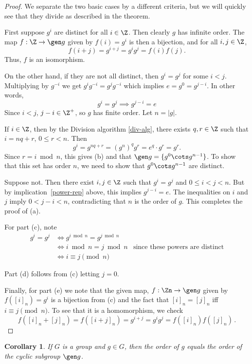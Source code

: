 \documentclass[12pt]{amsart}
\theoremstyle{plain}
\newtheorem{cor}[thm]{Corollary}
\theoremstyle{definition}
\theoremstyle{remark}
\begin{document}
\begin{proof}
  We separate the two basic cases by a different criteria, but we will
  quickly see that they divide as described in the theorem.

  First suppose $g^i$ are distinct for all $i\in\Z$.  Then clearly $g$
  has infinite order.  The map $f:\Z\to \gen g$ given by $f(i)=g^i$ is
  then a bijection, and for all $i,j\in\Z$, 
  $$f(i+j)=g^{i+j} =g^ig^j=f(i)f(j).$$
  Thus, $f$ is an isomorphism.

  On the other hand, if they are not all distinct, then $g^i=g^j$ for
  some $i<j$.  Multiplying by $g^{-i}$ we get $g^ig^{-i} = g^jg^{-i}$
  which implies $e=g^0=g^{j-i}$.  In other words,
\begin{equation} \label{power-rep}
g^i=g^j \implies g^{j-i} = e
\end{equation}
Since $i<j$, $j-i\in\Z^+$, so $g$ has finite order.  Let $n=|g|$.

If $i\in\Z$, then by the Division algorithm \ref{div-alg}, there
exists $q,r\in\Z$ such that $i=nq+r$, $0\leq r<n$.  Then
\[ g^i = g^{nq+r} = (g^n)^q g^r = e^q\cdot g^r = g^r.\]
Since $r=i\bmod n$, this gives (b) and that $\gen g=\{g^0\cots
g^{n-1}\}$.  To show that this set has order $n$, we need to show that
$g^0\cots g^{n-1}$ are distinct.

Suppose not.  Then there exist $i,j\in\Z$ such that $g^i=g^j$ and
$0\leq i<j<n$.  But by implication~\ref{power-rep} above, this implies
$g^{j-i}=e$.  The inequalities on $i$ and $j$ imply $0< j-i < n$,
contradicting that $n$ is the order of $g$.  This completes the proof
of (a).

For part (c), note
\begin{align*}
 g^i=g^j &\iff g^{i\bmod n} = g^{j\bmod n} \\
&\iff i\bmod n=j\bmod n &\text{since these powers are distinct} \\
&\iff i\equiv j \pmod n
\end{align*}

Part (d) follows from (c) letting $j=0$.

Finally, for part (e) we note that the given map, $f:\Zn\to\gen g$
given by $f([i]_n) = g^i$ is a bijection from
(c) and the fact that $[i]_n=[j]_n$ iff $i\equiv j\pmod n$.  To see
that it is a homomorphism, we check
\[ f([i]_n+[j]_n) = f([i+j]_n) = g^{i+j}=g^ig^j=f([i]_n)f([j]_n)\,.\]
\end{proof}
\begin{cor}
  If $G$ is a group and $g\in G$, then the order of $g$ equals the
  order of the cyclic subgroup $\gen g$.
\end{cor}
\end{document}
